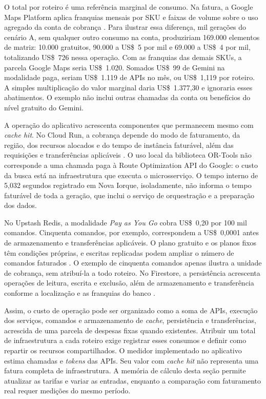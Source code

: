O total por roteiro é uma referência marginal de consumo. Na fatura, a Google Maps Platform aplica franquias mensais por SKU e faixas de volume sobre o uso agregado da conta de cobrança \cite{google_maps_precos2026}. Para ilustrar essa diferença, mil gerações do cenário A, sem qualquer outro consumo na conta, produziriam 169.000 elementos de matriz: 10.000 gratuitos, 90.000 a US\$~5 por mil e 69.000 a US\$~4 por mil, totalizando US\$~726 nessa operação. Com as franquias das demais SKUs, a parcela Google Maps seria US\$~1.020. Somados US\$~99 de Gemini na modalidade paga, seriam US\$~1.119 de APIs no mês, ou US\$~1,119 por roteiro. A simples multiplicação do valor marginal daria US\$~1.377,30 e ignoraria esses abatimentos. O exemplo não inclui outras chamadas da conta ou benefícios do nível gratuito do Gemini.

A operação do aplicativo acrescenta componentes que permanecem mesmo com \textit{cache hit}. No Cloud Run, a cobrança depende do modo de faturamento, da região, dos recursos alocados e do tempo de instância faturável, além das requisições e transferências aplicáveis \cite{google_cloudrun_precos2026}. O uso local da biblioteca OR-Tools não corresponde a uma chamada paga à Route Optimization API do Google: o custo da busca está na infraestrutura que executa o microsserviço. O tempo interno de 5,032 segundos registrado em Nova Iorque, isoladamente, não informa o tempo faturável de toda a geração, que inclui o serviço de orquestração e a preparação dos dados.

No Upstash Redis, a modalidade \textit{Pay as You Go} cobra US\$~0,20 por 100 mil comandos. Cinquenta comandos, por exemplo, correspondem a US\$~0,0001 antes de armazenamento e transferências aplicáveis. O plano gratuito e os planos fixos têm condições próprias, e escritas replicadas podem ampliar o número de comandos faturados \cite{upstash_redis_precos2026}. O exemplo de cinquenta comandos apenas ilustra a unidade de cobrança, sem atribuí-la a todo roteiro. No Firestore, a persistência acrescenta operações de leitura, escrita e exclusão, além de armazenamento e transferência conforme a localização e as franquias do banco \cite{firebase_firestore_precos2026}.

Assim, o custo de operação pode ser organizado como a soma de APIs, execução dos serviços, comandos e armazenamento de \textit{cache}, persistência e transferências, acrescida de uma parcela de despesas fixas quando existentes. Atribuir um total de infraestrutura a cada roteiro exige registrar esses consumos e definir como repartir os recursos compartilhados. O medidor implementado no aplicativo estima chamadas e \textit{tokens} das APIs. Seu valor com \textit{cache hit} não representa uma fatura completa de infraestrutura. A memória de cálculo desta seção permite atualizar as tarifas e variar as entradas, enquanto a comparação com faturamento real requer medições do mesmo período.
\FloatBarrier
